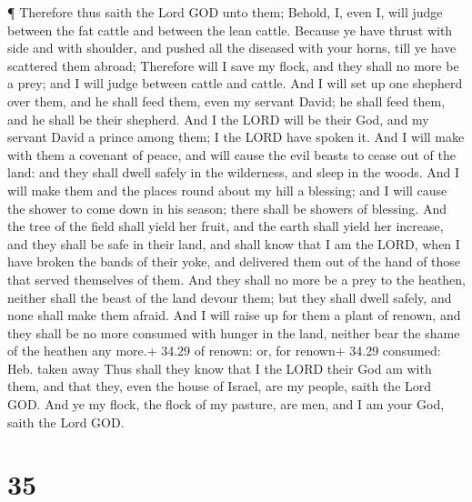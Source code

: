  ¶ Therefore thus saith the Lord GOD unto them; Behold, I,
even I, will judge between the fat cattle and between the lean cattle.
 Because ye have thrust with side and with shoulder, and
pushed all the diseased with your horns, till ye have scattered them
abroad;  Therefore will I save my flock, and they shall no
more be a prey; and I will judge between cattle and cattle.
 And I will set up one shepherd over them, and he shall
feed them, even my servant David; he shall feed them, and he shall be
their shepherd.  And I the LORD will be their God, and my
servant David a prince among them; I the LORD have spoken it.
 And I will make with them a covenant of peace, and will
cause the evil beasts to cease out of the land: and they shall dwell
safely in the wilderness, and sleep in the woods.  And I
will make them and the places round about my hill a blessing; and I will
cause the shower to come down in his season; there shall be showers of
blessing.  And the tree of the field shall yield her fruit,
and the earth shall yield her increase, and they shall be safe in their
land, and shall know that I am the LORD, when I have broken the bands of
their yoke, and delivered them out of the hand of those that served
themselves of them.  And they shall no more be a prey to
the heathen, neither shall the beast of the land devour them; but they
shall dwell safely, and none shall make them afraid.  And I
will raise up for them a plant of renown, and they shall be no more
consumed with hunger in the land, neither bear the shame of the heathen
any more.+ 34.29 of renown: or, for renown+ 34.29 consumed: Heb. taken
away  Thus shall they know that I the LORD their God am
with them, and that they, even the house of Israel, are my people, saith
the Lord GOD.  And ye my flock, the flock of my pasture,
are men, and I am your God, saith the Lord GOD.

\hypertarget{section-34}{%
\section{35}\label{section-34}}

